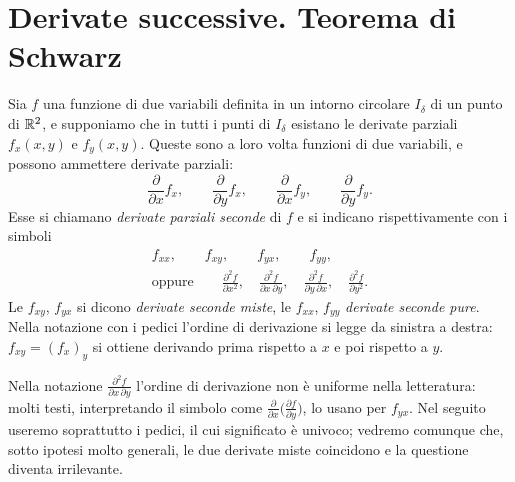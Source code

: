 \section{Derivate successive. Teorema di Schwarz}
\label{sec:schwarz}

Sia $f$ una funzione di due variabili definita in un intorno circolare $I_{\delta}$ di un
punto di $\mathbb{R}^{2}$, e supponiamo che in tutti i punti di $I_{\delta}$ esistano le derivate
parziali $f_{x}(x,y)$ e $f_{y}(x,y)$. Queste sono a loro volta funzioni di due
variabili, e possono ammettere derivate parziali:
\begin{equation}\label{eq:derivate-seconde-def}
  \frac{\partial}{\partial x}f_{x}, \qquad \frac{\partial}{\partial y}f_{x}, \qquad
  \frac{\partial}{\partial x}f_{y}, \qquad \frac{\partial}{\partial y}f_{y} .
\end{equation}
Esse si chiamano \emph{derivate parziali seconde} di $f$ e si indicano rispettivamente con
i simboli
\begin{equation}\label{eq:derivate-seconde-notazioni}
\begin{gathered}
  f_{xx}, \qquad f_{xy}, \qquad f_{yx}, \qquad f_{yy},\\
  \text{oppure}\qquad
  \frac{\partial^{2}f}{\partial x^{2}}, \quad \frac{\partial^{2}f}{\partial x\,\partial y}, \quad
  \frac{\partial^{2}f}{\partial y\,\partial x}, \quad \frac{\partial^{2}f}{\partial y^{2}} .
\end{gathered}
\end{equation}
Le $f_{xy}$, $f_{yx}$ si dicono \emph{derivate seconde miste}, le $f_{xx}$, $f_{yy}$
\emph{derivate seconde pure}. Nella notazione con i pedici l'ordine di derivazione si
legge da sinistra a destra: $f_{xy}=(f_{x})_{y}$ si ottiene derivando prima rispetto a $x$
e poi rispetto a $y$.

\begin{attenzione}
Nella notazione $\frac{\partial^{2}f}{\partial x\,\partial y}$ l'ordine di derivazione non è
uniforme nella letteratura: molti testi, interpretando il simbolo come
$\frac{\partial}{\partial x}\bigl(\frac{\partial f}{\partial y}\bigr)$, lo usano per $f_{yx}$.
Nel seguito useremo soprattutto i pedici, il cui significato è univoco; vedremo comunque
che, sotto ipotesi molto generali, le due derivate miste coincidono e la questione
diventa irrilevante.
\end{attenzione}

